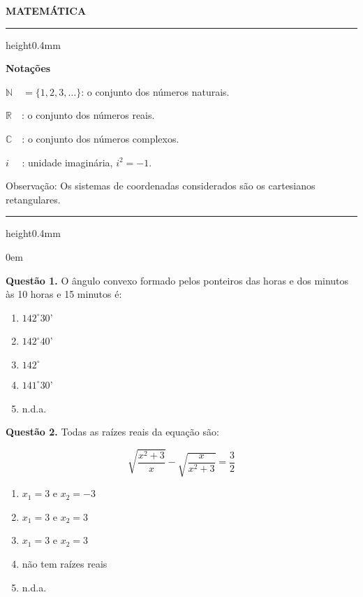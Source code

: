 \documentclass[11pt]{article}
\newcommand*\varhrulefill[1][0.4pt]{\leavevmode\leaders\hrule height#1\hfill\kern0pt}
\begin{document}
\begin{center}
    \textbf{MATEMÁTICA}
\end{center}

\noindent\varhrulefill[0.4mm]

\vspace{6pt}

\noindent \textbf{Notações}

\vspace{6pt}

$\mathbb{N}\quad = \{ 1,2,3, \dots \}$: o conjunto dos números naturais.

$\mathbb{R}\quad$: o conjunto dos números reais.

$\mathbb{C}\quad$: o conjunto dos números complexos.

$i \, \, \quad$: unidade imaginária, $i^2 = -1$.

\vspace{6pt}

\noindent Observação: Os sistemas de coordenadas considerados são os cartesianos retangulares.

\noindent\varhrulefill[0.4mm]

\vspace{6pt}

\parindent0em

\textbf{Questão 1.} O ângulo convexo formado pelos ponteiros das horas e dos minutos às 10 horas e 15 minutos é: 

\begin{multicols}{5}
    \begin{enumerate}[\bf A (\quad)]
        \item $142^{\circ}30$' 
        \item $142^{\circ}40$’
        \item $142^{\circ}$
        \item $141^{\circ}30$’
        \item n.d.a.
    \end{enumerate}
\end{multicols}

\textbf{Questão 2.} Todas as raízes reais da equação são:

$$
\sqrt{\dfrac{x^2 + 3}{x}} - \sqrt{\dfrac{x}{x^2 + 3}} = \dfrac{3}{2}
$$

\begin{enumerate}[\bf A (\quad)]
    \item $x_1 = 3$ e $x_2 = -3$
    \item $x_1 = 3$ e $x_2 = 3$
    \item $x_1 = 3$ e $x_2 = 3$
    \item não tem raízes reais
    \item n.d.a.
\end{enumerate}
\end{document}
